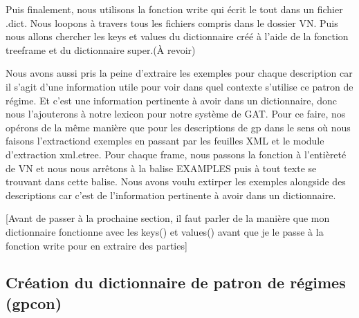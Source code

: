 Puis finalement, nous  utilisons la fonction write qui écrit le tout dans un fichier .dict. Nous loopons à travers tous les fichiers compris dans le dossier VN. Puis nous allons chercher les keys et values du dictionnaire créé à l'aide de la fonction treeframe et du dictionnaire super.(À revoir)

Nous avons aussi pris la peine d'extraire les exemples pour chaque description car il s'agit d'une information utile pour voir dans quel contexte s'utilise ce patron de régime. Et c'est une information pertinente à avoir dans un dictionnaire, donc nous l'ajouterons à notre lexicon pour notre système de GAT. Pour ce faire, nos opérons de la même manière que pour les descriptions de gp dans le sens où nous faisons l'extractiond exemples en passant par les feuilles XML et le module d'extraction xml.etree. Pour chaque frame, nous passons la fonction à l'entièreté de VN et nous nous arrêtons à la balise EXAMPLES puis à tout texte se trouvant dans cette balise. Nous avons voulu extirper les exemples alongside des descriptions car c'est de l'information pertinente à avoir dans un dictionnaire.

[Avant de passer à la prochaine section, il faut parler de la manière que mon dictionnaire fonctionne avec les keys() et values() avant que je le passe à la fonction write pour en extraire des parties]

\subsection{Création du dictionnaire de patron de régimes (gpcon)}

